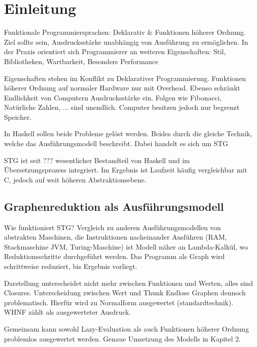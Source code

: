 
\chapter{Einleitung}

Funktionale Programmiersprachen: Deklarativ \& Funktionen höherer Ordnung.
Ziel sollte sein, Ausdrucksstärke unabhängig von Ausführung zu ermöglichen.
In der Praxis orientiert sich Programmierer an weiteren Eigenschaften: Stil, Bibliotheken, Wartbarkeit, Besonders Performance

Eigenschaften stehen im Konflikt zu Deklarativer Programmierung.
Funktionen höherer Ordnung auf normaler Hardware nur mit Overhead.
Ebenso schränkt Endlichkeit von Computern Ausdrucksstärke ein.
Folgen wie Fibonacci, Natürliche Zahlen, ... sind unendlich.
Computer besitzen jedoch nur begrenzt Speicher.

In Haskell sollen beide Probleme gelöst werden.
Beides durch die gleiche Technik, welche das Ausführungsmodell beschreibt.
Dabei handelt es sich um STG 

STG ist seit ??? \cn{} wesentlicher Bestandteil von Haskell und im Übersetzungsprozess integriert.
Im Ergebnis ist Laufzeit häufig vergleichbar mit C, jedoch auf weit höheren Abstraktionsebene.


\section{Graphenreduktion als Ausführungsmodell}

Wie funktioniert STG?
Vergleich zu anderen Ausführungsmodellen von abstrakten Maschinen, die Instruktionen nacheinander Ausführen (RAM, Stackmaschine JVM, Turing-Maschine) ist Modell näher an Lambda-Kalkül, wo Reduktionsschritte durchgeführt werden.
Das Programm als Graph wird schrittweise reduziert, bis Ergebnis vorliegt.


Darstellung unterscheidet nicht mehr zwischen Funktionen und Werten, alles sind Closures.
Unterscheidung zwischen Wert und Thunk 
Endlose Graphen dennoch problematisch.
Hierfür wird zu Normalform ausgewertet (standardtechnik).
WHNF zählt als ausgewerteter Ausdruck.


Gemeinsam kann sowohl Lazy-Evaluation als auch Funktionen höherer Ordnung problemlos ausgewertet werden.
Genaue Umsetzung des Modells in Kapitel 2.


